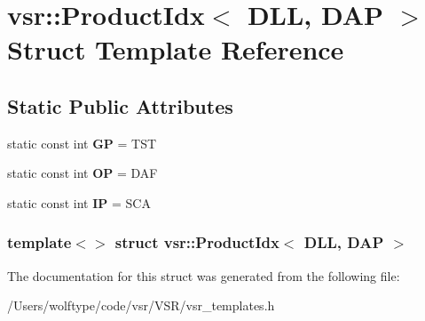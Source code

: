 \hypertarget{structvsr_1_1_product_idx_3_01_d_l_l_00_01_d_a_p_01_4}{\section{vsr\-:\-:Product\-Idx$<$ D\-L\-L, D\-A\-P $>$ Struct Template Reference}
\label{structvsr_1_1_product_idx_3_01_d_l_l_00_01_d_a_p_01_4}
}
\subsection*{Static Public Attributes}
\begin{DoxyCompactItemize}
\item 
\hypertarget{structvsr_1_1_product_idx_3_01_d_l_l_00_01_d_a_p_01_4_ad05ea4892bce467e6a0012bd701ead02}{static const int {\bfseries G\-P} = T\-S\-T}\label{structvsr_1_1_product_idx_3_01_d_l_l_00_01_d_a_p_01_4_ad05ea4892bce467e6a0012bd701ead02}

\item 
\hypertarget{structvsr_1_1_product_idx_3_01_d_l_l_00_01_d_a_p_01_4_afb34a9e608f98a1e3d02e120c82a1c57}{static const int {\bfseries O\-P} = D\-A\-F}\label{structvsr_1_1_product_idx_3_01_d_l_l_00_01_d_a_p_01_4_afb34a9e608f98a1e3d02e120c82a1c57}

\item 
\hypertarget{structvsr_1_1_product_idx_3_01_d_l_l_00_01_d_a_p_01_4_a2a5bdb7ad3b90f44c6be132009a3a8a0}{static const int {\bfseries I\-P} = S\-C\-A}\label{structvsr_1_1_product_idx_3_01_d_l_l_00_01_d_a_p_01_4_a2a5bdb7ad3b90f44c6be132009a3a8a0}

\end{DoxyCompactItemize}
\subsubsection*{template$<$$>$ struct vsr\-::\-Product\-Idx$<$ D\-L\-L, D\-A\-P $>$}



The documentation for this struct was generated from the following file\-:\begin{DoxyCompactItemize}
\item 
/\-Users/wolftype/code/vsr/\-V\-S\-R/vsr\-\_\-templates.\-h\end{DoxyCompactItemize}
